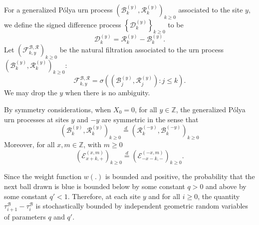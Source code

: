 \documentclass[EJP]{ejpecp} %
\begin{document}
For a generalized P\'{o}lya urn process $\left(\mathcal{B}^{(y)}_k,\mathcal{R}^{(y)}_k \right)_{k\geq 0}$ associated to the site $y$, we define the signed difference process $\left\{\mathcal{D}^{(y)}_{k}\right\}_{k \ge 0} $ to be
\begin{equation}\label{eq:signed difference}
	\mathcal{D}^{(y)}_k  =\mathcal{R}^{(y)}_k -\mathcal{B}^{(y)}_k.  
\end{equation}
Let $\left(\mathcal{F}^{\mathcal{B},\mathcal{R}}_{k, y}\right)_{k \ge 0}$ be the natural filtration associated to the urn process $\left(\mathcal{B}^{(y)}_k,\mathcal{R}^{(y)}_k \right)_{k\geq 0}$:  
\[
\mathcal{F}^{\mathcal{B},\mathcal{R}}_{k, y} = \sigma\left( \left(\mathcal{B}_j^{(y)},\mathcal{R}_j^{(y)} \right): j\leq k \right).
\]  
We may drop the $y$ when there is no ambiguity.
\begin{remark}
	\label{rm:symmetry}
	By symmetry considerations, when $X_0 = 0$, for all $y \in \mathbb{Z}$, the generalized P\'{o}lya urn processes at sites $y$ and $-y$ are symmetric in the sense that
	$$\left(\mathcal{B}^{(y)}_{k},\mathcal{R}^{(y)}_{k} \right)_{k\ge 0}
	\overset{d}{=} 
	\left(\mathcal{R}^{(-y)}_{k},\mathcal{B}^{(-y)}_{k} \right)_{k\ge 0} $$
	Moreover, for all $x, m \in \mathbb{Z}$, with $m\geq 0$
	\[
	\left(\mathcal{E}^{(x,m)}_{x+k,+} \right)_{k\geq 0} \overset{d}{=} \left(\mathcal{E}^{(-x,m)}_{-x-k,-} \right)_{k\geq 0}.
	\]
\end{remark}
\begin{remark}
	\label{rk:UrnGeo}
	Since the weight function $w(.)$ is bounded and positive, the probability that the next ball drawn is blue is bounded below by some constant $q > 0$ and above by some constant $q' < 1$. Therefore, at each site $y$ and for all $i \ge 0$, the quantity $\tau_{i+1}^{\mathcal{B}} - \tau_{i}^{\mathcal{B}}$ is stochastically bounded by independent geometric random variables of parameters $q$ and $q'$. 
\end{remark}
\end{document}
